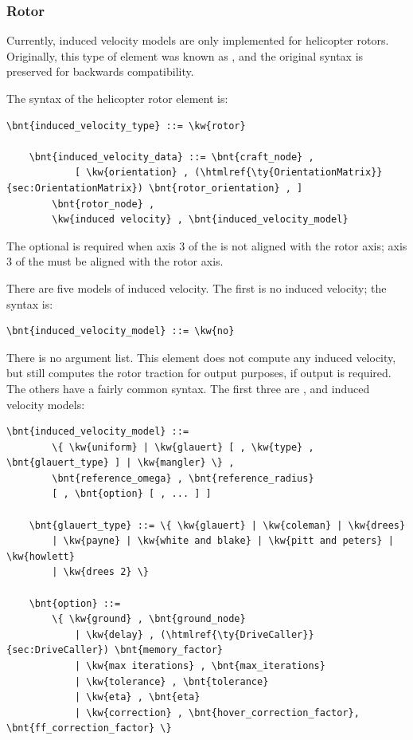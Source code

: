 \subsubsection{Rotor}
\label{sec:EL:AERO:INDVEL:ROTOR}
Currently, induced velocity models are only implemented
for helicopter rotors.
Originally, this type of element was known as ,
and the original syntax is preserved for backwards compatibility.

The syntax of the helicopter rotor  element is:
\begin{Verbatim}[commandchars=\\\{\}]
    \bnt{induced_velocity_type} ::= \kw{rotor}

    \bnt{induced_velocity_data} ::= \bnt{craft_node} ,
            [ \kw{orientation} , (\htmlref{\ty{OrientationMatrix}}{sec:OrientationMatrix}) \bnt{rotor_orientation} , ]
        \bnt{rotor_node} ,
        \kw{induced velocity} , \bnt{induced_velocity_model}
\end{Verbatim}
The optional  is required when axis 3 
of the  is not aligned with the rotor axis; axis 3
of the  must be aligned with the rotor axis.

There are five models of induced velocity. 
The first is no induced velocity; the syntax is:
\begin{Verbatim}[commandchars=\\\{\}]
    \bnt{induced_velocity_model} ::= \kw{no}
\end{Verbatim}
There is no argument list. This element does not compute any induced
velocity, but still computes the rotor traction for output purposes,
if output is required.
The others have a fairly common syntax.  The first three are
,  and  induced velocity
models:
\begin{Verbatim}[commandchars=\\\{\}]
    \bnt{induced_velocity_model} ::=
        \{ \kw{uniform} | \kw{glauert} [ , \kw{type} , \bnt{glauert_type} ] | \kw{mangler} \} , 
        \bnt{reference_omega} , \bnt{reference_radius}
        [ , \bnt{option} [ , ... ] ]

    \bnt{glauert_type} ::= \{ \kw{glauert} | \kw{coleman} | \kw{drees}
        | \kw{payne} | \kw{white and blake} | \kw{pitt and peters} | \kw{howlett}
        | \kw{drees 2} \}

    \bnt{option} ::=
        \{ \kw{ground} , \bnt{ground_node}
            | \kw{delay} , (\htmlref{\ty{DriveCaller}}{sec:DriveCaller}) \bnt{memory_factor}
            | \kw{max iterations} , \bnt{max_iterations}
            | \kw{tolerance} , \bnt{tolerance}
            | \kw{eta} , \bnt{eta}
            | \kw{correction} , \bnt{hover_correction_factor}, \bnt{ff_correction_factor} \}
\end{Verbatim}

